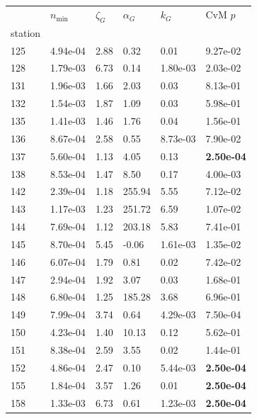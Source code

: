 \begin{figure}[htbp!]
{\begin{minipage}[t]{0.48\linewidth}
        \centering
        \begin{tabular}{llllll}
        \toprule
         & $n_{\min}$ & $\zeta_G$ & $\alpha_G$ & $k_G$ & CvM $p$ \\
        station &  &  &  &  &  \\
        \midrule
                    125 & 4.94e-04 & 2.88 & 0.32 & 0.01 & 9.27e-02\\
                    128 & 1.79e-03 & 6.73 & 0.14 & 1.80e-03 & 2.03e-02\\
                    131 & 1.96e-03 & 1.66 & 2.03 & 0.03 & 8.13e-01\\
                    132 & 1.54e-03 & 1.87 & 1.09 & 0.03 & 5.98e-01\\
                    135 & 1.41e-03 & 1.46 & 1.76 & 0.04 & 1.56e-01\\
                    136 & 8.67e-04 & 2.58 & 0.55 & 8.73e-03 & 7.90e-02\\
                    137 & 5.60e-04 & 1.13 & 4.05 & 0.13 & \textbf{2.50e-04}\\
                    138 & 8.53e-04 & 1.47 & 8.50 & 0.17 & 4.00e-03\\
                    142 & 2.39e-04 & 1.18 & 255.94 & 5.55 & 7.12e-02\\
                    143 & 1.17e-03 & 1.23 & 251.72 & 6.59 & 1.07e-02\\
                    144 & 7.69e-04 & 1.12 & 203.18 & 5.83 & 7.41e-01\\
                    145 & 8.70e-04 & 5.45 & -0.06 & 1.61e-03 & 1.35e-02\\
                    146 & 6.07e-04 & 1.79 & 0.81 & 0.02 & 7.42e-02\\
                    147 & 2.94e-04 & 1.92 & 3.07 & 0.03 & 1.68e-01\\
                    148 & 6.80e-04 & 1.25 & 185.28 & 3.68 & 6.96e-01\\
                    149 & 7.99e-04 & 3.74 & 0.64 & 4.29e-03 & 7.50e-04\\
                    150 & 4.23e-04 & 1.40 & 10.13 & 0.12 & 5.62e-01\\
                    151 & 8.38e-04 & 2.59 & 3.55 & 0.02 & 1.44e-01\\
                    152 & 4.86e-04 & 2.47 & 0.10 & 5.44e-03 & \textbf{2.50e-04}\\
                    155 & 1.84e-04 & 3.57 & 1.26 & 0.01 & \textbf{2.50e-04}\\
                    158 & 1.33e-03 & 6.73 & 0.61 & 1.23e-03 & \textbf{2.50e-04}\\

\end{tabular}
\end{minipage}}
\end{figure}
